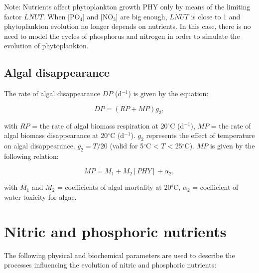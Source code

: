 Note: Nutrients affect phytoplankton growth PHY only by means of the limiting factor $LNUT$.
When [PO$_4$] and [NO$_3$] are big enough, $LNUT$ is close to 1 and
phytoplankton evolution no longer depends on nutrients.
In this case, there is no need to model the cycles of phosphorus and nitrogen
in order to simulate the evolution of phytoplankton.

\subsection{Algal disappearance}

The rate of algal disappearance $DP$ (d$^{-1}$) is given by the equation:

\begin{equation}
  DP = (RP+MP) g_2,
\end{equation}

with $RP$ = the rate of algal biomass respiration at 20$^{\circ}$C (d$^{-1}$),
$MP$ = the rate of algal biomass disappearance at 20$^{\circ}$C (d$^{-1}$).
$g_2$ represents the effect of temperature on algal disappearance.
$g_2 = T/20$ (valid for 5$^{\circ}$C < $T$ < 25$^{\circ}$C).
$MP$ is given by the following relation:

\begin{equation}
  MP = M_1 + M_2 [PHY] + \alpha_2,
\end{equation}

with $M_1$ and $M_2$ = coefficients of algal mortality at 20$^{\circ}$C,
$\alpha_2$ = coefficient of water toxicity for algae.

\section{Nitric and phosphoric nutrients}

The following physical and biochemical parameters are used
to describe the processes influencing the evolution of nitric and phosphoric nutrients:

